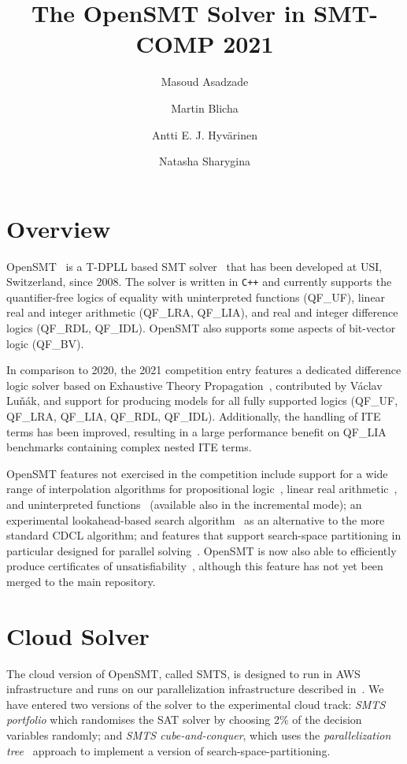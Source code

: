 \documentclass{easychair}
\title{The OpenSMT Solver in SMT-COMP 2021}
\author{
Masoud Asadzade \and
Martin Blicha \and
Antti E. J. Hyv{\"a}rinen \and
Natasha Sharygina \\
}
\institute{Universit{\`a} della Svizzera italiana (USI), Lugano,
Switzerland}
\date{}
\newcommand{\qflra}{QF\_LRA}
\newcommand{\qflia}{QF\_LIA}
\newcommand{\qfuf}{QF\_UF}
\newcommand{\qfbv}{QF\_BV}
\newcommand{\qfrdl}{QF\_RDL}
\newcommand{\qfidl}{QF\_IDL}
\begin{document}
\maketitle

\section{Overview}

OpenSMT~\cite{HyvarinenMAS16} is a T-DPLL based SMT
solver~\cite{NieuwenhuisOT:JACM06} that has been developed at USI,
Switzerland, since 2008.  The solver is written in {\tt C++} and
currently supports the quantifier-free logics of equality with
uninterpreted functions (\qfuf), linear real and integer arithmetic
(\qflra, \qflia), and real and integer difference logics (\qfrdl,
\qfidl).  OpenSMT also supports some aspects of bit-vector logic
(\qfbv).

In comparison to 2020, the 2021 competition entry features a dedicated
difference logic solver based on Exhaustive Theory
Propagation~\cite{Nieuwenhuis_2005}, contributed by V{\'a}clav Lu{\v
n}{\'a}k, and support for producing models for all fully supported
logics (\qfuf, \qflra, \qflia, \qfrdl, \qfidl).  Additionally, the
handling of ITE terms has been improved, resulting in a large
performance benefit on \qflia{} benchmarks containing complex nested ITE
terms.

OpenSMT features not exercised in the competition include support for a
wide range of interpolation algorithms for propositional
logic~\cite{AltFHS:VSTTE2015}, linear real
arithmetic~\cite{BlichaHKS19}, and uninterpreted
functions~\cite{AltHAS:FMCAD17} (available also in the incremental
mode); an experimental look\-ahead-based search
algorithm~\cite{HyvarinenMSCS18} as an alternative to the more standard
CDCL algorithm; and features that support search-space partitioning in
particular designed for parallel solving~\cite{HyvarinenMS:SAT15}.
OpenSMT is now also able to efficiently produce certificates of
unsatisfiability~\cite{OtoniBEHS:DAC21}, although this feature has not
yet been merged to the main repository.

\section{Cloud Solver}
The cloud version of OpenSMT, called SMTS, is designed to run in AWS
infrastructure and runs on our parallelization infrastructure described
in~\cite{MarescottiHS18}.
%
We have entered two versions of the solver to the experimental cloud
track: {\em SMTS portfolio} which randomises the SAT solver by choosing
2\% of the decision variables randomly; and {\em SMTS cube-and-conquer},
which uses the {\em parallelization tree}~\cite{HyvarinenMS:SAT15}
approach to implement a version of search-space-partitioning.
\end{document}
